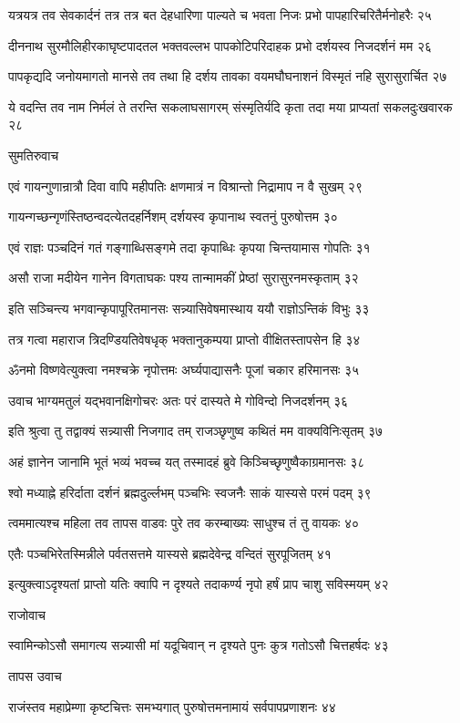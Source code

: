 यत्रयत्र तव सेवकार्दनं तत्र तत्र बत देहधारिणा
पाल्यते च भवता निजः प्रभो पापहारिचरितैर्मनोहरैः २५

दीननाथ सुरमौलिहीरकाघृष्टपादतल भक्तवल्लभ
पापकोटिपरिदाहक प्रभो दर्शयस्व निजदर्शनं मम २६

पापकृद्यदि जनोयमागतो मानसे तव तथा हि दर्शय
तावका वयमघौघनाशनं विस्मृतं नहि सुरासुरार्चित २७

ये वदन्ति तव नाम निर्मलं ते तरन्ति सकलाघसागरम्
संस्मृतिर्यदि कृता तदा मया प्राप्यतां सकलदुःखवारक २८

सुमतिरुवाच

एवं गायन्गुणान्रात्रौ दिवा वापि महीपतिः
क्षणमात्रं न विश्रान्तो निद्रामाप न वै सुखम् २९

गायन्गच्छन्गृणंस्तिष्ठन्वदत्येतदहर्निशम्
दर्शयस्व कृपानाथ स्वतनुं पुरुषोत्तम ३०

एवं राज्ञः पञ्चदिनं गतं गङ्गाब्धिसङ्गमे
तदा कृपाब्धिः कृपया चिन्तयामास गोपतिः ३१

असौ राजा मदीयेन गानेन विगताघकः
पश्य तान्मामकीं प्रेष्ठां सुरासुरनमस्कृताम् ३२

इति सञ्चिन्त्य भगवान्कृपापूरितमानसः
सन्न्यासिवेषमास्थाय ययौ राज्ञोऽन्तिकं विभुः ३३

तत्र गत्वा महाराज त्रिदण्डियतिवेषधृक्
भक्तानुकम्पया प्राप्तो वीक्षितस्तापसेन हि ३४

ॐनमो विष्णवेत्युक्त्वा नमश्चक्रे नृपोत्तमः
अर्घ्यपाद्यासनैः पूजां चकार हरिमानसः ३५

उवाच भाग्यमतुलं यद्भवानक्षिगोचरः
अतः परं दास्यते मे गोविन्दो निजदर्शनम् ३६

इति श्रुत्वा तु तद्वाक्यं सन्न्यासी निजगाद तम्
राजञ्छृणुष्व कथितं मम वाक्यविनिःसृतम् ३७

अहं ज्ञानेन जानामि भूतं भव्यं भवच्च यत्
तस्मादहं ब्रुवे किञ्चिच्छृणुष्वैकाग्रमानसः ३८

श्वो मध्याह्ने हरिर्दाता दर्शनं ब्रह्मदुर्ल्लभम्
पञ्चभिः स्वजनैः साकं यास्यसे परमं पदम् ३९

त्वममात्यश्च महिला तव तापस वाडवः
पुरे तव करम्बाख्यः साधुश्च तं तु वायकः ४०

एतैः पञ्चभिरेतस्मिन्नीले पर्वतसत्तमे
यास्यसे ब्रह्मदेवेन्द्र वन्दितं सुरपूजितम् ४१

इत्युक्त्वाऽदृश्यतां प्राप्तो यतिः क्वापि न दृश्यते
तदाकर्ण्य नृपो हर्षं प्राप चाशु सविस्मयम् ४२

राजोवाच

स्वामिन्कोऽसौ समागत्य सन्न्यासी मां यदूचिवान्
न दृश्यते पुनः कुत्र गतोऽसौ चित्तहर्षदः ४३

तापस उवाच

राजंस्तव महाप्रेम्णा कृष्टचित्तः समभ्यगात्
पुरुषोत्तमनामायं सर्वपापप्रणाशनः ४४

